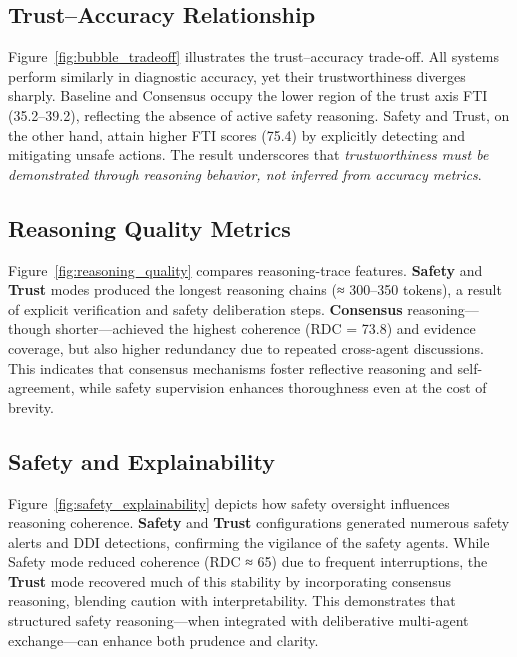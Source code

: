 \documentclass[letterpaper]{article} %
\begin{document}
\subsection{Trust–Accuracy Relationship}

Figure~\ref{fig:bubble_tradeoff} illustrates the trust–accuracy trade-off.  
All systems perform similarly in diagnostic accuracy, yet their trustworthiness diverges sharply.  
Baseline and Consensus occupy the lower region of the trust axis FTI (35.2–39.2), reflecting the absence of active safety reasoning.  
Safety and Trust, on the other hand, attain higher FTI scores (75.4) by explicitly detecting and mitigating unsafe actions.  
The result underscores that \emph{trustworthiness must be demonstrated through reasoning behavior, not inferred from accuracy metrics}.

\subsection{Reasoning Quality Metrics}

Figure~\ref{fig:reasoning_quality} compares reasoning-trace features.  
\textbf{Safety} and \textbf{Trust} modes produced the longest reasoning chains (≈ 300–350 tokens), a result of explicit verification and safety deliberation steps.  
\textbf{Consensus} reasoning—though shorter—achieved the highest coherence (RDC = 73.8) and evidence coverage, but also higher redundancy due to repeated cross-agent discussions.  
This indicates that consensus mechanisms foster reflective reasoning and self-agreement, while safety supervision enhances thoroughness even at the cost of brevity.

\subsection{Safety and Explainability}

Figure~\ref{fig:safety_explainability} depicts how safety oversight influences reasoning coherence.  
\textbf{Safety} and \textbf{Trust} configurations generated numerous safety alerts and DDI detections, confirming the vigilance of the safety agents.  
While Safety mode reduced coherence (RDC ≈ 65) due to frequent interruptions, the \textbf{Trust} mode recovered much of this stability by incorporating consensus reasoning, blending caution with interpretability.  
This demonstrates that structured safety reasoning—when integrated with deliberative multi-agent exchange—can enhance both prudence and clarity.
\end{document}
